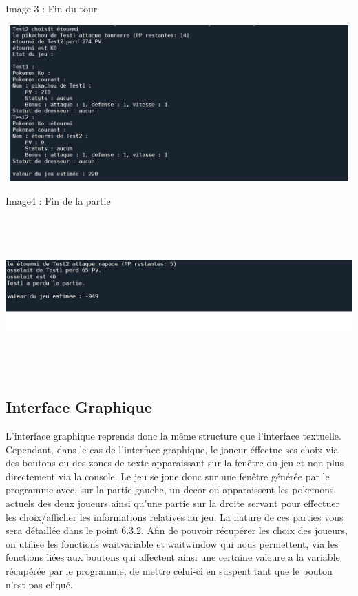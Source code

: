                Image 3 : Fin du tour
                
                \includegraphics[width=16cm,height=6cm]{images/text3}

                Image4 : Fin de la partie
                
                \includegraphics[width=16cm,height=6cm]{images/text4}
                

            \bigskip
    \subsection{Interface Graphique}
        L'interface graphique reprends donc la même structure que l'interface textuelle. Cependant, dans le cas de l'interface graphique, le joueur éffectue ses choix via des boutons ou des zones de texte apparaissant sur la fenêtre du jeu et non plus directement via la console. Le jeu se joue donc sur une fenêtre générée par le programme avec, sur la partie gauche, un decor ou apparaissent les pokemons actuels des deux joueurs ainsi qu'une partie sur la droite servant pour effectuer les choix/afficher les informations relatives au jeu. La nature de ces parties vous sera détaillée dans le point 6.3.2.
        Afin de pouvoir récupérer les choix des joueurs, on utilise les fonctions waitvariable et waitwindow qui nous permettent, via les fonctions liées aux boutons qui affectent ainsi une certaine valeure a la variable récupérée par le programme, de mettre celui-ci en suspent tant que le bouton n'est pas cliqué. 
        
